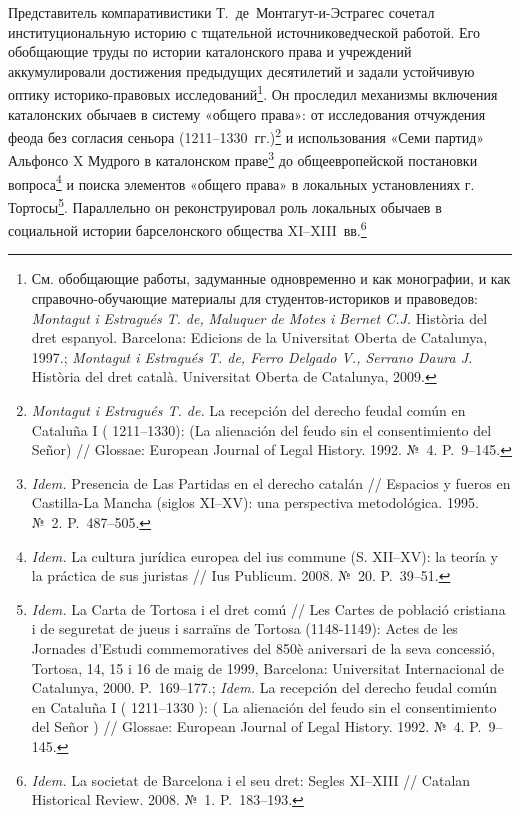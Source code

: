 Представитель компаративистики Т.~де~Монтагут-и-Эстрагес сочетал институциональную историю с тщательной источниковедческой работой. Его обобщающие труды по истории каталонского права и учреждений аккумулировали достижения предыдущих десятилетий и задали устойчивую оптику историко-правовых исследований\footnote{См. обобщающие работы, задуманные одновременно и как монографии, и как справочно-обучающие материалы для студентов-историков и правоведов: \emph{Montagut}\emph{ }\emph{i}\emph{ }\emph{Estragués}\emph{ T. de, }\emph{Maluquer}\emph{ de Motes }\emph{i}\emph{ Bernet C.J. }Història del dret espanyol. Barcelona: Edicions de la Universitat Oberta de Catalunya, 1997.; \emph{Montagut i Estragués T. de, Ferro Delgado V., Serrano Daura J.} Història del dret català. Universitat Oberta de Catalunya, 2009.}. Он проследил механизмы включения каталонских обычаев в систему «общего права»: от исследования отчуждения феода без согласия сеньора (1211--1330~гг.)\footnote{\emph{Montagut i Estragués T. de.} La recepción del derecho feudal común en Cataluña I ( 1211--1330): (La alienación del feudo sin el consentimiento del Señor) // Glossae: European Journal of Legal History. 1992. №~4. P.~9--145.} и использования «Семи партид» Альфонсо X Мудрого в каталонском праве\footnote{\emph{Idem.} Presencia de Las Partidas en el derecho catalán // Espacios y fueros en Castilla-La Mancha (siglos XI--XV): una perspectiva metodológica. 1995. №~2. P.~487--505.} до общеевропейской постановки вопроса\footnote{\emph{Idem.} La cultura jurídica europea del ius commune (S. XII--XV): la teoría y la práctica de sus juristas // Ius Publicum. 2008. №~20. P.~39--51.} и поиска элементов  «общего права» в локальных установлениях г. Тортосы\footnote{\emph{Idem.} La Carta de Tortosa i el dret comú // Les Cartes de població cristiana i de seguretat de jueus i sarraïns de Tortosa (1148-1149): Actes de les Jornades d'Estudi commemoratives del 850è aniversari de la seva concessió, Tortosa, 14, 15 i 16 de maig de 1999, Barcelona: Universitat Internacional de Catalunya, 2000. P.~169--177.; \emph{Idem.} La recepción del derecho feudal común en Cataluña I ( 1211--1330 ): ( La alienación del feudo sin el consentimiento del Señor ) // Glossae: European Journal of Legal History. 1992. №~4. P.~9--145.}. Параллельно он реконструировал роль локальных обычаев в социальной истории барселонского общества XI--XIII~вв.\footnote{\emph{Idem.} La societat de Barcelona i el seu dret: Segles XI--XIII // Catalan Historical Review. 2008. №~1. P.~183--193.}

